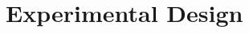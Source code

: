 \documentclass{article}
\begin{document}










\section{Experimental Design}\label{sec:method}
\end{document}
